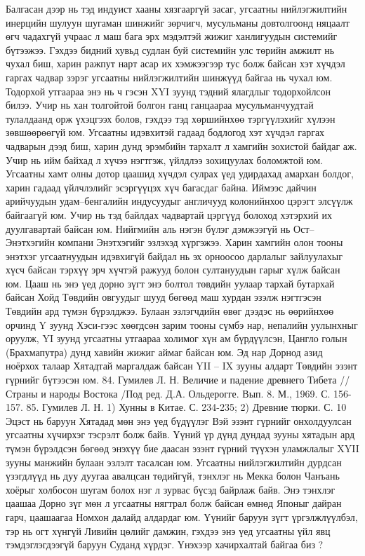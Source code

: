 Балгасан дээр нь тэд индуист хааны хязгааргүй засаг, угсаатны нийлэгжилтийн инерцийн шулуун шугаман шинжийг зөрчигч, мусульманы довтолгоонд няцаалт өгч чадахгүй учраас л маш бага эрх мэдэлтэй жижиг ханлигуудын системийг бүтээжээ. Гэхдээ бидний хувьд судлан буй системийн улс төрийн амжилт нь чухал биш, харин ражпут нарт асар их хэмжээгээр тус болж байсан хэт хүчдэл гаргах чадвар зэрэг угсаатны нийлэгжилтийн шинжүүд байгаа нь чухал юм. Тодорхой утгаараа энэ нь ч гэсэн XYI зуунд тэдний ялагдлыг тодорхойлсон билээ. Учир нь хан толгойтой болгон ганц ганцаараа мусульманчуудтай тулалдаанд орж үхэцгээх болов, гэхдээ тэд хөршийнхөө тэргүүлэхийг хүлээн зөвшөөрөөгүй юм. Угсаатны идэвхитэй гадаад бодлогод хэт хүчдэл гаргах чадварын дээд биш, харин дунд эрэмбийн тархалт л хамгийн зохистой байдаг аж. Учир нь ийм байхад л хүчээ нэгтгэж, үйлдлээ зохицуулах боломжтой юм. Угсаатны хамт олны дотор цаашид хүчдэл сулрах үед удирдахад амархан болдог, харин гадаад үйлчлэлийг эсэргүүцэх хүч багасдаг байна. Иймээс дайчин арийчуудын удам–бенгалийн индусуудыг англичууд колонийнхоо цэрэгт элсүүлж байгаагүй юм. Учир нь тэд байлдах чадвартай цэргүүд болоход хэтэрхий их дуулгавартай байсан юм. Нийгмийн аль нэгэн бүлэг дэмжээгүй нь Ост–Энэтхэгийн компани Энэтхэгийг эзлэхэд хүргэжээ. Харин хамгийн олон тооны энэтхэг угсаатнуудын идэвхигүй байдал нь эх орноосоо дарлалыг зайлуулахыг хүсч байсан тэрхүү эрч хүчтэй ражууд болон султануудын гарыг хүлж байсан юм.
Цааш нь энэ үед дорно зүгт энэ болтол төвдийн уулаар тархай бутархай байсан Хойд Төвдийн овгуудыг шууд бөгөөд маш хурдан эзэлж нэгтгэсэн Төвдийн ард түмэн бүрэлджээ. Булаан эзлэгчдийн өвөг дээдэс нь өөрийнхөө орчинд Y зуунд Хэси-гээс хөөгдсөн зарим тооны сүмбэ нар, непалийн уулынхныг оруулж, YI зуунд угсаатны утгаараа холимог хүн ам бүрдүүлсэн, Цангло голын (Брахмапутра) дунд хавийн жижиг аймаг байсан юм. Эд нар Дорнод азид ноёрхох талаар Хятадтай маргалдаж байсан YII – IX зууны алдарт Төвдийн эзэнт гүрнийг бүтээсэн юм. 84. Гумилев Л. Н. Величие и падение древнего Тибета //Страны и народы Востока /Под ред. Д.А. Ольдерогге. Вып. 8. М., 1969. С. 156-157. 85. Гумилев Л. Н. 1) Хунны в Китае. С. 234-235; 2) Древние тюрки. С. 10
Эцэст нь баруун Хятадад мөн энэ үед бүдүүлэг Вэй эзэнт гүрнийг онхолдуулсан угсаатны хүчирхэг тэсрэлт болж байв. Үүний үр дүнд дундад зууны хятадын ард түмэн бүрэлдсэн бөгөөд энэхүү бие даасан эзэнт гүрний түүхэн уламжлалыг XYII зууны манжийн булаан эзлэлт тасалсан юм.
Угсаатны нийлэгжилтийн дурдсан үзэгдлүүд нь дуу дуугаа авалцсан төдийгүй, тэнхлэг нь Мекка болон Чанъань хоёрыг холбосон шугам болох нэг л зурвас бүсэд байрлаж байв. Энэ тэнхлэг цаашаа Дорно зүг мөн л угсаатны нягтрал болж байсан өмнөд Японыг дайран гарч, цаашаагаа Номхон далайд алдардаг юм. Үүнийг баруун зүгт үргэлжлүүлбэл, тэр нь огт хүнгүй Ливийн цөлийг дамжин, гэхдээ энэ үед угсаатны үйл явц тэмдэглэгдээгүй баруун Суданд хүрдэг. Үнэхээр хачирхалтай байгаа биз ?
